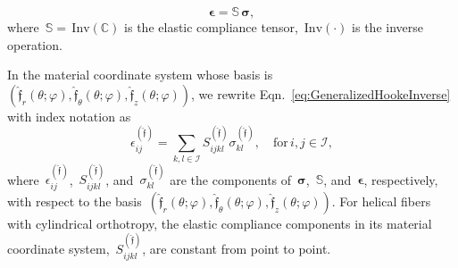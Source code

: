 \documentclass[preprint,12pt,times]{elsarticle}
\numberwithin{equation}{section}
\newcommand{\physf}{\hat{\boldsymbol{\mathfrak{f}}}}
\renewcommand{\u}[1]{\boldsymbol{#1}}
\newcommand{\usf}[1]{\u{\mathsf #1}}
\newcommand{\pr}[1]{\left( #1 \right)}
\newcommand{\Inv}{\,\mathrm{Inv}}
\renewcommand{\>}{$\Rightarrow$}
\begin{document}
\begin{equation}
 \u{\epsilon} = \mathbb{S}\, \u{\sigma},
\label{eq:GeneralizedHookeInverse}
\end{equation}
where~$\mathbb{S} = \Inv\pr{\mathbb{C}}$ is the elastic compliance tensor, $\Inv\pr{\cdot}$ is the inverse operation.

In the material coordinate system whose basis is~$\pr{\physf_{r}(\theta;\varphi),\physf_{\theta}(\theta;\varphi),\physf_{z}(\theta;\varphi)}$, we rewrite Eqn.~\eqref{eq:GeneralizedHookeInverse} with index notation as
\begin{equation}
\epsilon_{ij}^{\pr{\physf}} = \sum_{k,l \in \mathcal{I}}  S_{ijkl}^{\pr{\physf}} \sigma_{kl}^{\pr{\physf}}, \quad \text{for} \,i,j \in \mathcal{I} ,
\label{eq:GeneralizedHookeComponents}
\end{equation}
where~$\epsilon_{ij}^{\pr{\physf}}$,~$S_{ijkl}^{\pr{\physf}}$, and~$\sigma_{kl}^{\pr{\physf}}$ are the components of~$\u{\sigma}$,~$\mathbb{S}$, and~$\u{\epsilon}$, respectively, with respect to the basis~$\pr{\physf_{r}(\theta;\varphi),\physf_{\theta}(\theta;\varphi),\physf_{z}(\theta;\varphi)}$. For helical fibers with cylindrical orthotropy, the elastic compliance components in its material coordinate system,~$S_{ijkl}^{\pr{\physf}}$, are constant from point to point.


\end{document}
